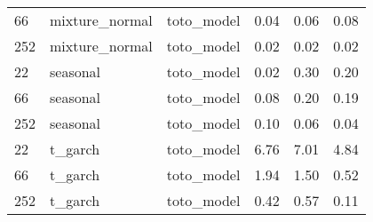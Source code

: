 {\begin{tabular}{lllrrr}
66 & mixture\_normal & toto\_model & 0.04 & 0.06 & 0.08 \\
252 & mixture\_normal & toto\_model & 0.02 & 0.02 & 0.02 \\
\midrule
22 & seasonal & toto\_model & 0.02 & 0.30 & 0.20 \\
66 & seasonal & toto\_model & 0.08 & 0.20 & 0.19 \\
252 & seasonal & toto\_model & 0.10 & 0.06 & 0.04 \\
\midrule
22 & t\_garch & toto\_model & 6.76 & 7.01 & 4.84 \\
66 & t\_garch & toto\_model & 1.94 & 1.50 & 0.52 \\
252 & t\_garch & toto\_model & 0.42 & 0.57 & 0.11 \\
\bottomrule
\end{tabular}
}